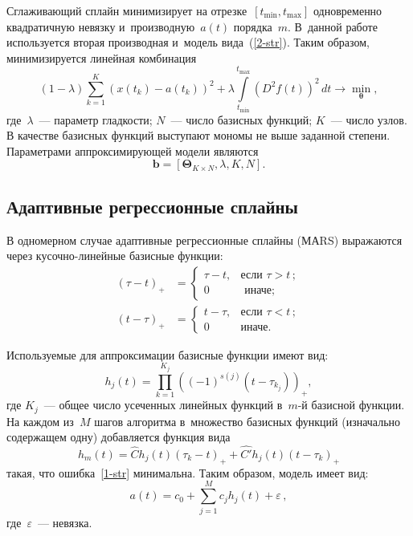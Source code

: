 \begin{multicols}{2}
Сглаживающий сплайн минимизирует на отрезке~$\left[t_{\min},t_{\max}\right]$ 
одновременно квадратичную невязку и~производную~$a(t)$ порядка~$m$.
В~данной работе используется вторая производная и~модель вида~(\ref{2-str}). 
Таким образом, минимизируется  линейная комбинация
$$
(1-\lambda)\sum\limits_{k=1}^K \left(x(t_k)-a(t_k)\right)^2+
\lambda\!\int\limits_{t_{\min}}^{t_{\max}}\!\!\!\left(D^2f(t)\right)^2\,dt 
\rightarrow \min_\mathbf{\theta},
$$
где~$\lambda$~--- параметр гладкости; $N$~--- число базисных функций; 
$K$~--- число узлов.
В качестве базисных функций выступают мономы не выше заданной степени. 
Параметрами аппроксимирующей модели являются
\begin{equation}
\label{5-str}
\mathbf{b} = \left[\boldsymbol{\Theta}_{K \times N},\lambda, K, N\right].
\end{equation}

\subsection{Адаптивные регрессионные сплайны}

В одномерном случае адаптивные регрессионные сплайны 
(МАRS) выражаются через ку\-соч\-но-ли\-ней\-ные базисные функции:
\begin{align*}
(\tau-t)_+ &=
\begin{cases}
\tau-t, &\mbox{если\ } \tau>t\,;\\
0 &\mbox{ иначе;}
\end{cases}
\\
(t-\tau)_+ &=
\begin{cases}
t-\tau, &\mbox{если } \tau<t\,;\\
0 &\mbox{иначе.}
\end{cases}
\end{align*}

Используемые для аппроксимации базисные функции имеют вид:
$$
h_j(t)=\prod\limits_{k=1}^{K_j}\left((-1)^{s(j)}(t-\tau_{k_j})\right)_+,
$$
где $K_j$~--- общее число усеченных линейных функций в~$m$-й базисной функции.
На каждом из~$M$ шагов алгоритма в~множество базисных функций 
(изначально содержащем одну) добавляется функция вида
$$
h_m(t)=\hat{C}h_j(t)\left(\tau_k-t\right)_++\hat{C'}h_j(t)\left(t-\tau_k\right)_+
$$
такая, что ошибка~\eqref{1-str} минимальна.
Таким образом, модель имеет вид:
\begin{equation}
\label{3-str}
a(t)= c_0 +  \sum\limits_{j=1}^M c_j h_j(t) +\varepsilon\,,
\end{equation}
где~$\varepsilon$~--- невязка.


\end{multicols}
